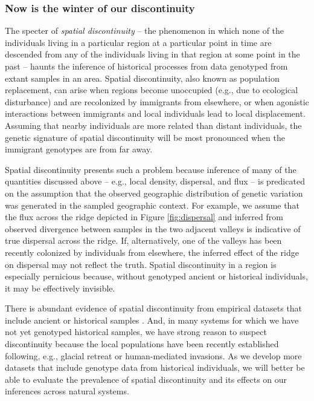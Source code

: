 \documentclass{ar-1col}
\newcommand{\plr}[1]{{\color{green}{#1}}}
\begin{document}
\subsubsection{Now is the winter of our discontinuity}

\plr{shorten this up, I think, and call it something besides discontinuity? I have not heard this, and connotes other things to me.}

The specter of \textit{spatial discontinuity} --
the phenomenon in which none of the individuals 
living in a particular region at a particular point in time 
are descended from any of the individuals living in that region 
at some point in the past
-- haunts the inference of historical processes
from data genotyped from extant samples in an area.
Spatial discontinuity, 
also known as population replacement, 
can arise when regions become unoccupied
(e.g., due to ecological disturbance) 
and are recolonized by immigrants from elsewhere, 
or when agonistic interactions between immigrants and local individuals 
lead to local displacement. 
Assuming that nearby individuals are more related than distant individuals, 
the genetic signature of spatial discontinuity will be most pronounced 
when the immigrant genotypes are from far away.

Spatial discontinuity presents such a problem because 
inference of many of the quantities discussed above --  
e.g., local density, dispersal, and flux --
is predicated on the assumption that 
the observed geographic distribution of genetic variation 
was generated in the sampled geographic context.
For example, 
we assume that the flux across the ridge 
depicted in Figure \ref{fig:dispersal}
and inferred from observed divergence 
between samples in the two adjacent valleys 
is indicative of true dispersal across the ridge.
If, alternatively, one of the valleys 
has been recently colonized by individuals from elsewhere, 
the inferred effect of the ridge on dispersal may not reflect the truth.
Spatial discontinuity in a region is especially pernicious because, 
without genotyped ancient or historical individuals, 
it may be effectively invisible.

There is abundant evidence of spatial discontinuity 
from empirical datasets that include ancient or historical samples 
\citep{bi2013unlocking, skoglund2014investigating, PickrellReich2014, lazaridis_ancient_2014, haak2015massive, allentoft2015population, joseph2018inference}.
And, in many systems for which we have not yet genotyped historical samples, 
we have strong reason to suspect discontinuity 
because the local populations have been recently established 
following, e.g., glacial retreat or human-mediated invasions.
As we develop more datasets that include genotype data from historical individuals, 
we will better be able to evaluate the prevalence of spatial discontinuity 
and its effects on our inferences across natural systems. 
\end{document}
